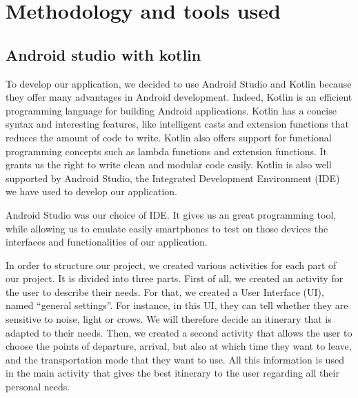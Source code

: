 \section{Methodology and tools used}

\subsection{Android studio with kotlin}
To develop our application, we decided to use Android Studio and Kotlin because they offer many advantages in Android development. Indeed, Kotlin is an efficient programming language for building Android applications. 
Kotlin has a concise syntax and interesting features, like intelligent casts and extension functions that reduces the amount of code to write.
Kotlin also offers support for functional programming concepts such as lambda functions and extension functions. It grants us the right to write clean and modular code easily. Kotlin is also well supported by Android Studio, the Integrated Development Environment (IDE) we have used to develop our application.\newline

Android Studio was our choice of IDE. It gives us an great programming tool, while allowing us to emulate easily smartphones to test on those devices the interfaces and functionalities of our application. \newline

In order to structure our project, we created various activities for each part of our project. It is divided into three parts. First of all, we created an activity for the user to describe their needs. For that, we created a User Interface (UI), named “general settings”. For instance, in this UI, they can tell whether they are sensitive to noise, light or crows. We will therefore decide an itinerary that is adapted to their needs. Then, we created a second activity that allows the user to choose the points of departure, arrival, but also at which time they want to leave, and the transportation mode that they want to use. All this information is used in the main activity that gives the best itinerary to the user regarding all their personal needs. \newline


